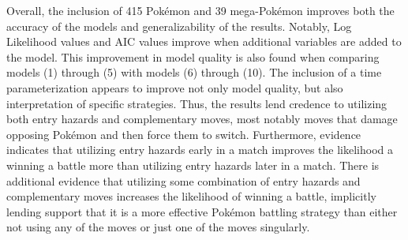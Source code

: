 \documentclass[12pt,twoside]{reedthesis}
\begin{document}
  Overall, the inclusion of 415 Pokémon and 39 mega-Pokémon improves both
  the accuracy of the models and generalizability of the results. Notably,
  Log Likelihood values and AIC values improve when additional variables
  are added to the model. This improvement in model quality is also found
  when comparing models (1) through (5) with models (6) through (10). The
  inclusion of a time parameterization appears to improve not only model
  quality, but also interpretation of specific strategies. Thus, the
  results lend credence to utilizing both entry hazards and complementary
  moves, most notably moves that damage opposing Pokémon and then force
  them to switch. Furthermore, evidence indicates that utilizing entry
  hazards early in a match improves the likelihood a winning a battle more
  than utilizing entry hazards later in a match. There is additional
  evidence that utilizing some combination of entry hazards and
  complementary moves increases the likelihood of winning a battle,
  implicitly lending support that it is a more effective Pokémon battling
  strategy than either not using any of the moves or just one of the moves
  singularly.
  
\end{document}
